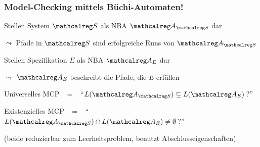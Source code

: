    \begin{frame}
      \frametitle{Model-Checking mittels Büchi-Automaten!}

      \par\smallskip
      \begin{Itemize}
        \item
          Stellen System $\calS$ als NBA $\Aut{A}_{\calS}$ dar
          \par\smallskip
          $\leadsto$ Pfade in $\calS$ sind erfolgreiche Runs von $\Aut{A}_{\calS}$
          \par\bigskip
        \item<2->
          Stellen Spezifikation $E$ als NBA $\Aut{A}_E$ dar
          \par\smallskip
          $\leadsto$ $\Aut{A}_E$ beschreibt die Pfade, die $E$ erfüllen
          \par\bigskip
        \item<3->[$\leadsto$]
          Universelles MCP ~$=$~ "`$L(\Aut{A}_{\calS}) \subseteq L(\Aut{A}_E)$\,?"'
          \par\smallskip
          Existenzielles MCP ~$=$~ "`$L(\Aut{A}_{\calS}) \cap L(\Aut{A}_E) \neq \emptyset$\,?"'
          \par\smallskip
          {\footnotesize (beide reduzierbar zum Leerheitsproblem, benutzt Abschlusseigenschaften)}
      \end{Itemize}

      \par\bigskip

    \end{frame}

